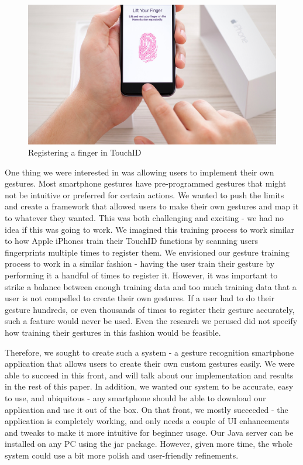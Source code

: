 \documentclass{sigchi}
\begin{document}
\begin{figure}[!t]
\centering
\includegraphics[width=0.8\columnwidth]{touchid}
\caption{Registering a finger in TouchID}
\label{fig:figure3}
\end{figure}

One thing we were interested in was allowing users to implement their own gestures. Most smartphone gestures have pre-programmed gestures that might not be intuitive or preferred for certain actions. We wanted to push the limits and create a framework that allowed users to make their own gestures and map it to whatever they wanted. This was both challenging and exciting - we had no idea if this was going to work. We imagined this training process to work similar to how Apple iPhones train their TouchID functions by scanning users fingerprints multiple times to register them. We envisioned our gesture training process to work in a similar fashion - having the user train their gesture by performing it a handful of times to register it. However, it was important to strike a balance between enough training data and too much training data that a user is not compelled to create their own gestures. If a user had to do their gesture hundreds, or even thousands of times to register their gesture accurately, such a feature would never be used. Even the research we perused did not specify how training their gestures in this fashion would be feasible. 

Therefore, we sought to create such a system - a gesture recognition smartphone application that allows users to create their own custom gestures easily. We were able to succeed in this front, and will talk about our implementation and results in the rest of this paper. In addition, we wanted our system to be accurate, easy to use, and ubiquitous - any smartphone should be able to download our application and use it out of the box. On that front, we mostly succeeded - the application is completely working, and only needs a couple of UI enhancements and tweaks to make it more intuitive for beginner usage. Our Java server can be installed on any PC using the jar package. However, given more time, the whole system could use a bit more polish and user-friendly refinements.
\end{document}
